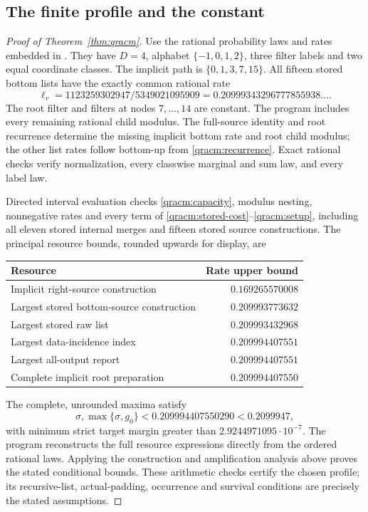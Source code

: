 \documentclass[10pt,a4paper]{article}
\theoremstyle{definition}
\begin{document}
\subsection{The finite profile and the constant}
\begin{proof}[Proof of Theorem~\ref{thm:qracm}]
Use the rational probability laws and rates embedded in
.  They have $D=4$, alphabet
$\{-1,0,1,2\}$, three filter labels and two equal coordinate classes.
The implicit path is $\{0,1,3,7,15\}$.  All fifteen stored bottom lists
have the exactly common rational rate
\[
 \ell_v=1123259302947/5349021095909
       =0.20999343296777855938\ldots .
\]
The root filter and filters at nodes $7,\ldots,14$ are constant.
The program includes every remaining rational child modulus.  The full-source identity and
root recurrence determine the missing implicit bottom rate and root
child modulus; the other list rates follow bottom-up from
\eqref{qracm:recurrence}.  Exact rational checks verify normalization,
every classwise marginal and sum law, and every label law.

Directed interval evaluation checks \eqref{qracm:capacity}, modulus
nesting, nonnegative rates and every term of
\eqref{qracm:stored-cost}--\eqref{qracm:setup}, including all eleven
stored internal merges and fifteen stored source constructions.
The principal resource bounds, rounded upwards for display, are
\begin{center}\small
\begin{tabular}{@{}lr@{}}\toprule
Resource & Rate upper bound\\\midrule
Implicit right-source construction & $0.169265570008$\\
Largest stored bottom-source construction & $0.209993773632$\\
Largest stored raw list & $0.209993432968$\\
Largest data-incidence index & $0.209994407551$\\
Largest all-output report & $0.209994407551$\\
Complete implicit root preparation & $0.209994407550$\\\bottomrule
\end{tabular}
\end{center}
The complete, unrounded maxima satisfy
\[
 \sigma,\max\{\sigma,g_0\}<0.209994407550290<0.2099947,
\]
with minimum strict target margin greater than
$2.9244971095\cdot10^{-7}$.  The program reconstructs the full resource expressions directly from
the ordered rational laws.  Applying the construction and amplification analysis
above proves the stated conditional bounds.  These arithmetic checks
certify the chosen profile; its recursive-list, actual-padding,
occurrence and survival conditions are precisely the stated assumptions.
\end{proof}
\end{document}
